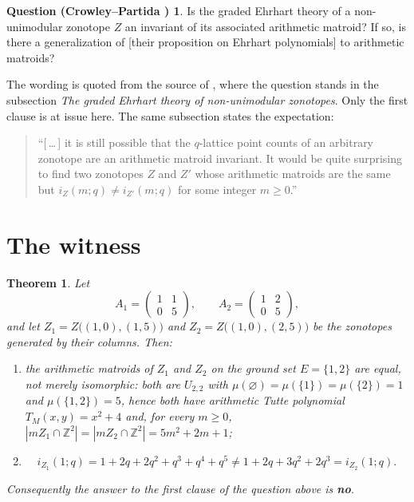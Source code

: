 \documentclass[11pt]{amsart}
\newtheorem{theorem}{Theorem}
\theoremstyle{definition}
\newtheorem*{cpq}{Question \textup{(Crowley--Partida \cite{CP})}}
\newcommand{\Z}{\mathbb Z}
\newcommand{\Zone}{Z_1}
\newcommand{\Ztwo}{Z_2}
\begin{document}
\begin{cpq}
Is the graded Ehrhart theory of a non-unimodular zonotope $Z$ an invariant of its associated
arithmetic matroid? If so, is there a generalization of \textup{[}their proposition on Ehrhart
polynomials\textup{]} to arithmetic matroids?
\end{cpq}

\noindent The wording is quoted from the source of \cite{CP}, where the question stands in the
subsection \emph{The graded Ehrhart theory of non-unimodular zonotopes}. Only the first clause is
at issue here. The same subsection states the expectation:
\begin{quote}
``[\,\dots\,] it is still possible that the $q$-lattice point counts of an arbitrary
zonotope are an arithmetic matroid invariant. It would be quite surprising to find two zonotopes
$Z$ and $Z'$ whose arithmetic matroids are the same but $i_Z(m;q)\ne i_{Z'}(m;q)$ for some
integer $m\ge0$.''
\end{quote}

\section{The witness}

\begin{theorem}\label{thm:main}
Let
\[
 A_1=\begin{pmatrix}1&1\\0&5\end{pmatrix},
 \qquad
 A_2=\begin{pmatrix}1&2\\0&5\end{pmatrix},
\]
and let $\Zone=Z\bigl((1,0),(1,5)\bigr)$ and $\Ztwo=Z\bigl((1,0),(2,5)\bigr)$ be the zonotopes
generated by their columns. Then:
\begin{enumerate}
\item[(a)] the arithmetic matroids of $\Zone$ and $\Ztwo$ on the ground set $E=\{1,2\}$ are
\emph{equal}, not merely isomorphic: both are $U_{2,2}$ with
$\mu(\varnothing)=\mu(\{1\})=\mu(\{2\})=1$ and $\mu(\{1,2\})=5$, hence both have arithmetic
Tutte polynomial $T_M(x,y)=x^2+4$ and, for every $m\ge0$,
$|m\Zone\cap\Z^2|=|m\Ztwo\cap\Z^2|=5m^2+2m+1$;
\item[(b)]
\[
 i_{\Zone}(1;q)=1+2q+2q^2+q^3+q^4+q^5
 \ne
 1+2q+3q^2+2q^3=i_{\Ztwo}(1;q).
\]
\end{enumerate}
Consequently the answer to the first clause of the question above is \textbf{no}.
\end{theorem}
\end{document}
